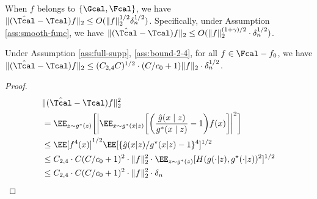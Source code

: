 \documentclass[12pt]{extarticle} %
\begin{document}
\begin{remark}
    When $f$ belongs to $\{\Gcal, \Fcal\}$, we have $\|(\hat{\Tcal} - \Tcal)f\|_2 \leq O(\|f\|_2^{1/2} \delta_n^{1/2})$. Specifically, under Assumption \ref{ass:smooth-func}, we have $\|(\hat{\Tcal} - \Tcal)f\|_2 \leq O(\|f\|_2^{(1+\gamma)/2} \cdot\delta_n^{1/2})$.
\end{remark}
\begin{lemma}\label{lem:approx-2}
    Under Assumption \ref{ass:full-supp}, \ref{ass:bound-2-4}, for all $f\in\Fcal - f_0$, we have $\|(\hat \Tcal-\Tcal)f\|_2 \leq (C_{2,4}C)^{1/2}\cdot (C/c_0 +1)\|f\|_{2}\cdot \delta_n^{1/2}$.
\end{lemma}
\begin{proof}
    \begin{align*}
    & \|(\hat \Tcal - \Tcal)f\|_2^2\\
    & = \EE_{z\sim g^*(z)}\bigg[\bigg|\EE_{x\sim g^*(x\mid z)}\bigg[\bigg(\frac{\hat{g}(x\mid z)}{g^*(x\mid z)} - 1\bigg)f(x)\bigg]\bigg|^2\bigg]\\
    &\leq \EE[f^4(x)]^{1/2}\EE[\{\hat g(x|z)/g^{\star}(x|z)-1\}^4]^{1/2}\\
    &\leq C_{2,4}\cdot C(C/c_0 +1)^2\cdot\|f\|_2^2\cdot \EE_{z\sim g^*(z)}[H(g(\cdot|z),g^{\star}(\cdot|z) )^2]^{1/2}\\
    &\leq C_{2,4}\cdot C(C/c_0 +1)^2\cdot\|f\|_2^2\cdot \delta_n
\end{align*}
\end{proof}
\end{document}

